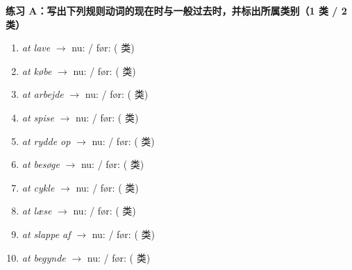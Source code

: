 \textbf{练习 A：写出下列规则动词的现在时与一般过去时，并标出所属类别（1 类 / 2 类）}
\begin{enumerate}
  \item \textit{at lave} $\rightarrow$ nu: \underline{\hspace{2.2cm}} / før: \underline{\hspace{2.4cm}} (\underline{\hspace{1.2cm}} 类)
  \item \textit{at købe} $\rightarrow$ nu: \underline{\hspace{2.2cm}} / før: \underline{\hspace{2.4cm}} (\underline{\hspace{1.2cm}} 类)
  \item \textit{at arbejde} $\rightarrow$ nu: \underline{\hspace{2.2cm}} / før: \underline{\hspace{2.4cm}} (\underline{\hspace{1.2cm}} 类)
  \item \textit{at spise} $\rightarrow$ nu: \underline{\hspace{2.2cm}} / før: \underline{\hspace{2.4cm}} (\underline{\hspace{1.2cm}} 类)
  \item \textit{at rydde op} $\rightarrow$ nu: \underline{\hspace{2.2cm}} / før: \underline{\hspace{2.4cm}} (\underline{\hspace{1.2cm}} 类)
  \item \textit{at besøge} $\rightarrow$ nu: \underline{\hspace{2.2cm}} / før: \underline{\hspace{2.4cm}} (\underline{\hspace{1.2cm}} 类)
  \item \textit{at cykle} $\rightarrow$ nu: \underline{\hspace{2.2cm}} / før: \underline{\hspace{2.4cm}} (\underline{\hspace{1.2cm}} 类)
  \item \textit{at læse} $\rightarrow$ nu: \underline{\hspace{2.2cm}} / før: \underline{\hspace{2.4cm}} (\underline{\hspace{1.2cm}} 类)
  \item \textit{at slappe af} $\rightarrow$ nu: \underline{\hspace{2.2cm}} / før: \underline{\hspace{2.4cm}} (\underline{\hspace{1.2cm}} 类)
  \item \textit{at begynde} $\rightarrow$ nu: \underline{\hspace{2.2cm}} / før: \underline{\hspace{2.4cm}} (\underline{\hspace{1.2cm}} 类)
\end{enumerate}

